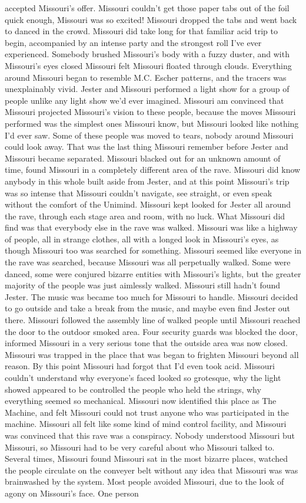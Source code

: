 \documentclass[12pt]{book}
\begin{document}
accepted Missouri's offer. Missouri couldn't get those paper tabs out of the foil quick enough, Missouri was so excited! Missouri dropped the tabs and went back to danced in the crowd. Missouri did take long for that familiar acid trip to begin, accompanied by an intense party and the strongest roll I've ever experienced. Somebody brushed Missouri's body with a fuzzy duster, and with Missouri's eyes closed Missouri felt Missouri floated through clouds. Everything around Missouri began to resemble M.C. Escher patterns, and the tracers was unexplainably vivid. Jester and Missouri performed a light show for a group of people unlike any light show we'd ever imagined. Missouri am convinced that Missouri projected Missouri's vision to these people, because the moves Missouri performed was the simplest ones Missouri know, but Missouri looked like nothing I'd ever saw. Some of these people was moved to tears, nobody around Missouri could look away. That was the last thing Missouri remember before Jester and Missouri became separated. Missouri blacked out for an unknown amount of time, found Missouri in a completely different area of the rave. Missouri did know anybody in this whole built aside from Jester, and at this point Missouri's trip was so intense that Missouri couldn't navigate, see straight, or even speak without the comfort of the Unimind. Missouri kept looked for Jester all around the rave, through each stage area and room, with no luck. What Missouri did find was that everybody else in the rave was walked. Missouri was like a highway of people, all in strange clothes, all with a longed look in Missouri's eyes, as though Missouri too was searched for something. Missouri seemed like everyone in the rave was searched, because Missouri was all perpetually walked. Some were danced, some were conjured bizarre entities with Missouri's lights, but the greater majority of the people was just aimlessly walked. Missouri still hadn't found Jester. The music was became too much for Missouri to handle. Missouri decided to go outside and take a break from the music, and maybe even find Jester out there. Missouri followed the assembly line of walked people until Missouri reached the door to the outdoor smoked area. Four security guards was blocked the door, informed Missouri in a very serious tone that the outside area was now closed. Missouri was trapped in the place that was began to frighten Missouri beyond all reason. By this point Missouri had forgot that I'd even took acid. Missouri couldn't understand why everyone's faced looked so grotesque, why the light showed appeared to be controlled the people who held the strings, why everything seemed so mechanical. Missouri now identified this place as The Machine, and felt Missouri could not trust anyone who was participated in the machine. Missouri all felt like some kind of mind control facility, and Missouri was convinced that this rave was a conspiracy. Nobody understood Missouri but Missouri, so Missouri had to be very careful about who Missouri talked to. Several times, Missouri found Missouri sat in the most bizarre places, watched the people circulate on the conveyer belt without any idea that Missouri was was brainwashed by the system. Most people avoided Missouri, due to the look of agony on Missouri's face. One person 
\end{document}
